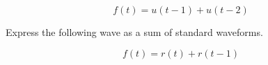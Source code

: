 \documentclass[fleqn, a4paper, 12pt, twoside]{article}
\theoremstyle{definition}
\theoremstyle{theorem}
\begin{document}
\begin{solution}[print]
	\begin{equation*}
		f(t) = u(t - 1) + u(t - 2)
	\end{equation*}
\end{solution}

\begin{question}
	Express the following wave as a sum of standard waveforms.
	\begin{figure}[H]
	\end{figure}
\end{question}

\begin{solution}[print]
	\begin{equation*}
		f(t) = r(t) + r(t - 1)
	\end{equation*}
\end{solution}
\end{document}
